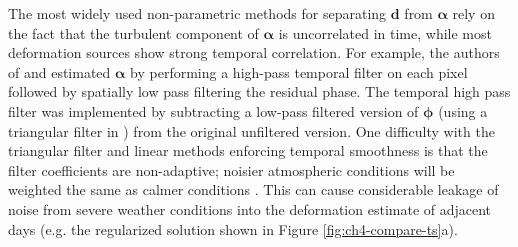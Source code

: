 The most widely used non-parametric methods for separating $ \bm{d} $ from $ \bm{\alpha} $ rely on the fact that the turbulent component of $\bm{\alpha}$ is uncorrelated in time, while most deformation sources show strong temporal correlation.
For example, the authors of \cite{Ferretti2000NonlinearSubsidenceRate} and \cite{Berardino2002NewAlgorithmSurface} estimated $\bm{\alpha}$ by performing a high-pass temporal filter on each pixel followed by spatially low pass filtering the residual phase.
The temporal high pass filter was implemented by subtracting a low-pass filtered version of $ \bm{\phi} $ (using a triangular filter in \cite{Ferretti2000NonlinearSubsidenceRate}) from the original unfiltered version.
One difficulty with the triangular filter and linear methods enforcing temporal smoothness
is that the filter coefficients are non-adaptive; noisier atmospheric conditions will be weighted the same as calmer conditions \citep{Liu2012SatelliteRadarInterferometry}.
This can cause considerable leakage of noise from severe weather conditions into the deformation estimate of adjacent days (e.g. the regularized solution shown in Figure \ref{fig:ch4-compare-ts}a).




